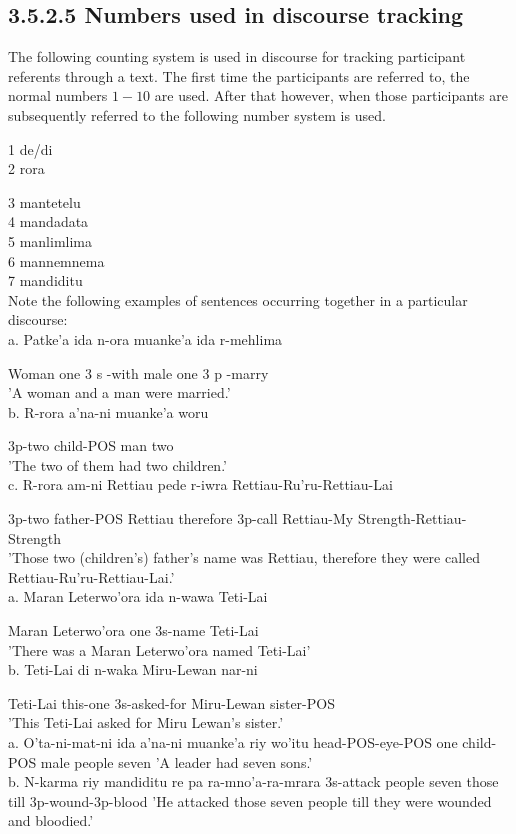 \documentclass[10pt]{article}
\begin{document}
\subsection*{3.5.2.5 Numbers used in discourse tracking}
The following counting system is used in discourse for tracking participant referents through a text. The first time the participants are referred to, the normal numbers \(1-10\) are used. After that however, when those participants are subsequently referred to the following number system is used.

1 de/di\\
2 rora

3 mantetelu\\
4 mandadata\\
5 manlimlima\\
6 mannemnema\\
7 mandiditu\\
Note the following examples of sentences occurring together in a particular discourse:\\
a. Patke'a ida n-ora muanke'a ida r-mehlima

Woman one 3 s -with male one 3 p -marry\\
'A woman and a man were married.'\\
b. R-rora a'na-ni muanke'a woru

3p-two child-POS man two\\
'The two of them had two children.'\\
c. R-rora am-ni Rettiau pede r-iwra Rettiau-Ru'ru-Rettiau-Lai

3p-two father-POS Rettiau therefore 3p-call Rettiau-My Strength-Rettiau-Strength\\
'Those two (children's) father's name was Rettiau, therefore they were called Rettiau-Ru'ru-Rettiau-Lai.'\\
a. Maran Leterwo'ora ida n-wawa Teti-Lai

Maran Leterwo'ora one 3s-name Teti-Lai\\
'There was a Maran Leterwo'ora named Teti-Lai'\\
b. Teti-Lai di n-waka Miru-Lewan nar-ni

Teti-Lai this-one 3s-asked-for Miru-Lewan sister-POS\\
'This Teti-Lai asked for Miru Lewan's sister.'\\
a. O'ta-ni-mat-ni ida a'na-ni muanke'a riy wo'itu head-POS-eye-POS one child-POS male people seven 'A leader had seven sons.'\\
b. N-karma riy mandiditu re pa ra-mno'a-ra-mrara 3s-attack people seven those till 3p-wound-3p-blood 'He attacked those seven people till they were wounded and bloodied.'
\end{document}
